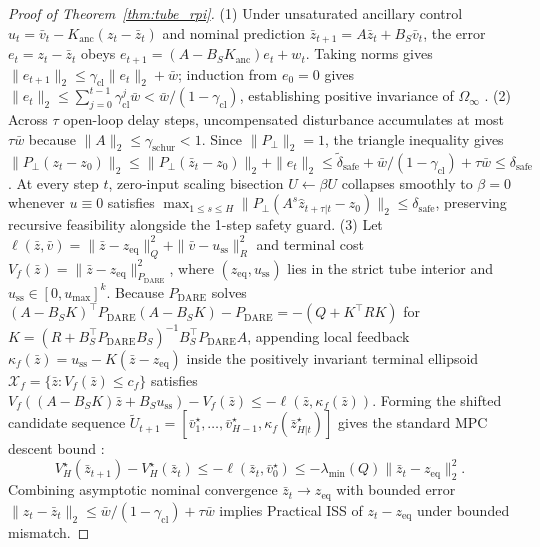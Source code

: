 \documentclass[journal]{IEEEtran}
\begin{document}
\begin{proof}[Proof of Theorem~\ref{thm:tube_rpi}]
(1) Under unsaturated ancillary control $u_t = \bar{v}_t - K_{\mathrm{anc}}(z_t - \bar{z}_t)$ and nominal prediction $\bar{z}_{t+1} = A\bar{z}_t + B_S\bar{v}_t$, the error $e_t = z_t - \bar{z}_t$ obeys $e_{t+1} = (A - B_S K_{\mathrm{anc}})e_t + w_t$. Taking norms gives $\|e_{t+1}\|_2 \le \gamma_{\mathrm{cl}}\|e_t\|_2 + \bar{w}$; induction from $e_0 = 0$ gives $\|e_t\|_2 \le \sum_{j=0}^{t-1}\gamma_{\mathrm{cl}}^j\bar{w} < \bar{w}/(1-\gamma_{\mathrm{cl}})$, establishing positive invariance of $\Omega_\infty$ \cite{mayne2005robust}.
(2) Across $\tau$ open-loop delay steps, uncompensated disturbance accumulates at most $\tau\bar{w}$ because $\|A\|_2 \le \gamma_{\mathrm{schur}} < 1$. Since $\|P_\perp\|_2 = 1$, the triangle inequality gives $\|P_\perp(z_t - z_0)\|_2 \le \|P_\perp(\bar{z}_t - z_0)\|_2 + \|e_t\|_2 \le \tilde{\delta}_{\mathrm{safe}} + \bar{w}/(1-\gamma_{\mathrm{cl}}) + \tau\bar{w} \le \delta_{\mathrm{safe}}$. At every step $t$, zero-input scaling bisection $U \leftarrow \beta U$ collapses smoothly to $\beta = 0$ whenever $u \equiv 0$ satisfies $\max_{1\le s\le H}\|P_\perp(A^s\hat{z}_{t+\tau|t} - z_0)\|_2 \le \delta_{\mathrm{safe}}$, preserving recursive feasibility alongside the 1-step safety guard.
(3) Let $\ell(\bar{z},\bar{v}) = \|\bar{z} - z_{\mathrm{eq}}\|_Q^2 + \|\bar{v} - u_{\mathrm{ss}}\|_R^2$ and terminal cost $V_f(\bar{z}) = \|\bar{z} - z_{\mathrm{eq}}\|_{P_{\mathrm{DARE}}}^2$, where $(z_{\mathrm{eq}}, u_{\mathrm{ss}})$ lies in the strict tube interior and $u_{\mathrm{ss}} \in [0, u_{\max}]^k$. Because $P_{\mathrm{DARE}}$ solves $(A - B_S K)^\top P_{\mathrm{DARE}}(A - B_S K) - P_{\mathrm{DARE}} = -(Q + K^\top R K)$ for $K = (R + B_S^\top P_{\mathrm{DARE}} B_S)^{-1} B_S^\top P_{\mathrm{DARE}} A$, appending local feedback $\kappa_f(\bar{z}) = u_{\mathrm{ss}} - K(\bar{z} - z_{\mathrm{eq}})$ inside the positively invariant terminal ellipsoid $\mathcal{X}_f = \{\bar{z} : V_f(\bar{z}) \le c_f\}$ satisfies $V_f((A - B_S K)\bar{z} + B_S u_{\mathrm{ss}}) - V_f(\bar{z}) \le -\ell(\bar{z}, \kappa_f(\bar{z}))$. Forming the shifted candidate sequence $\tilde{U}_{t+1} = [\bar{v}_1^\star,\dots,\bar{v}_{H-1}^\star,\kappa_f(\bar{z}_{H|t}^\star)]$ gives the standard MPC descent bound \cite{mayne2000constrained,rawlings2017model}:
\begin{equation*}
  V_H^\star(\bar{z}_{t+1}) - V_H^\star(\bar{z}_t) \le -\ell(\bar{z}_t, \bar{v}_0^\star) \le -\lambda_{\min}(Q)\|\bar{z}_t - z_{\mathrm{eq}}\|_2^2.
\end{equation*}
Combining asymptotic nominal convergence $\bar{z}_t \to z_{\mathrm{eq}}$ with bounded error $\|z_t - \bar{z}_t\|_2 \le \bar{w}/(1-\gamma_{\mathrm{cl}}) + \tau\bar{w}$ implies Practical ISS of $z_t - z_{\mathrm{eq}}$ under bounded mismatch.
\end{proof}
\end{document}
